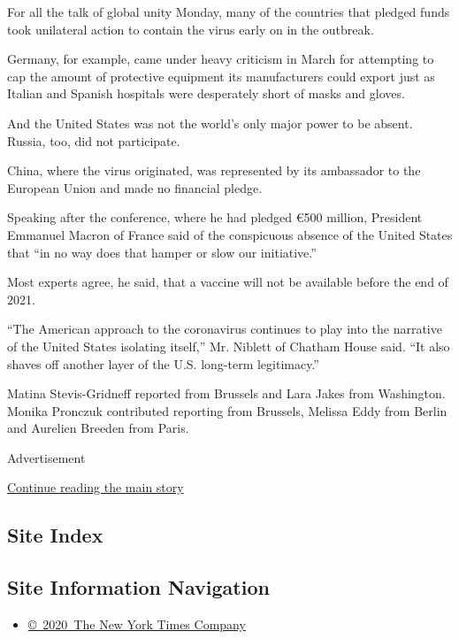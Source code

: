 For all the talk of global unity Monday, many of the countries that
pledged funds took unilateral action to contain the virus early on in
the outbreak.

Germany, for example, came under heavy criticism in March for attempting
to cap the amount of protective equipment its manufacturers could export
just as Italian and Spanish hospitals were desperately short of masks
and gloves.

And the United States was not the world's only major power to be absent.
Russia, too, did not participate.

China, where the virus originated, was represented by its ambassador to
the European Union and made no financial pledge.

Speaking after the conference, where he had pledged €500 million,
President Emmanuel Macron of France said of the conspicuous absence of
the United States that ``in no way does that hamper or slow our
initiative.''

Most experts agree, he said, that a vaccine will not be available before
the end of 2021.

``The American approach to the coronavirus continues to play into the
narrative of the United States isolating itself,'' Mr. Niblett of
Chatham House said. ``It also shaves off another layer of the U.S.
long-term legitimacy.''

Matina Stevis-Gridneff reported from Brussels and Lara Jakes from
Washington. Monika Pronczuk contributed reporting from Brussels, Melissa
Eddy from Berlin and Aurelien Breeden from Paris.

Advertisement

\protect\hyperlink{after-bottom}{Continue reading the main story}

\hypertarget{site-index}{%
\subsection{Site Index}\label{site-index}}

\hypertarget{site-information-navigation}{%
\subsection{Site Information
Navigation}\label{site-information-navigation}}

\begin{itemize}
\tightlist
\item
  \href{https://help.nytimes3xbfgragh.onion/hc/en-us/articles/115014792127-Copyright-notice}{©~2020~The
  New York Times Company}
\end{itemize}

